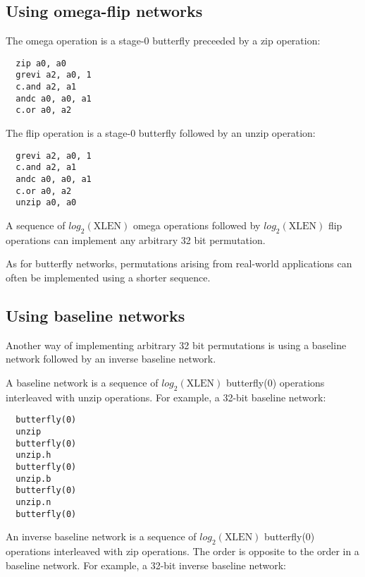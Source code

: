 \subsection{Using omega-flip networks}

The omega operation is a stage-0 butterfly preceeded by a zip operation:

\begin{verbatim}
  zip a0, a0
  grevi a2, a0, 1
  c.and a2, a1
  andc a0, a0, a1
  c.or a0, a2
\end{verbatim}

The flip operation is a stage-0 butterfly followed by an unzip operation:

\begin{verbatim}
  grevi a2, a0, 1
  c.and a2, a1
  andc a0, a0, a1
  c.or a0, a2
  unzip a0, a0
\end{verbatim}

A sequence of $log_2(\textrm{XLEN})$ omega operations followed by
$log_2(\textrm{XLEN})$ flip operations can implement any arbitrary 32 bit
permutation.

As for butterfly networks, permutations arising from real-world applications
can often be implemented using a shorter sequence.


\subsection{Using baseline networks}

Another way of implementing arbitrary 32 bit permutations is using a
baseline network followed by an inverse baseline network.

A baseline network is a sequence of $log_2(\textrm{XLEN})$ butterfly(0)
operations interleaved with unzip operations. For example, a 32-bit
baseline network:

\begin{verbatim}
  butterfly(0)
  unzip
  butterfly(0)
  unzip.h
  butterfly(0)
  unzip.b
  butterfly(0)
  unzip.n
  butterfly(0)
\end{verbatim}

An inverse baseline network is a sequence of $log_2(\textrm{XLEN})$ butterfly(0)
operations interleaved with zip operations. The order is opposite to the
order in a baseline network. For example, a 32-bit inverse baseline network:

